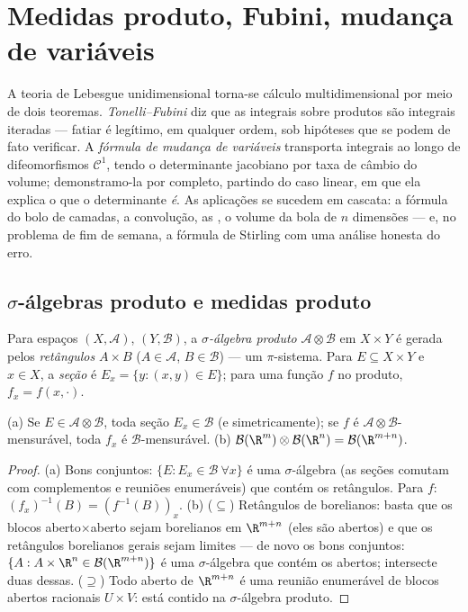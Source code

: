 \chapter{Medidas produto, Fubini, mudança de variáveis}
\label{ch:b3:product}

A teoria de Lebesgue unidimensional torna-se cálculo multidimensional
por meio de dois teoremas. \emph{Tonelli--Fubini} diz que as integrais
sobre produtos são integrais iteradas --- fatiar é legítimo, em
qualquer ordem, sob hipóteses que se podem de fato verificar. A
\emph{fórmula de mudança de variáveis} transporta integrais ao longo de
difeomorfismos $\mathcal C^1$, tendo o determinante jacobiano por taxa de câmbio
do volume; demonstramo-la por completo, partindo do caso linear, em que
ela explica o que o determinante \emph{é}. As aplicações se sucedem em
cascata: a fórmula do bolo de camadas, a convolução, as , o volume da bola de $n$ dimensões --- e, no problema de fim
de semana, a fórmula de Stirling com uma análise honesta do erro.

\section{$\sigma$-álgebras produto e medidas produto}

\begin{definition}\label{def:b3:product:sigma}
Para espaços  $(X, \mathcal A)$, $(Y, \mathcal B)$, a \emph{$\sigma$-álgebra
produto} $\mathcal A \otimes \mathcal B$ em $X \times
Y$ é gerada pelos
\emph{retângulos} $A \times B$ ($A \in
\mathcal A$, $B \in \mathcal B$) --- um $\pi$-sistema. Para $E
\subseteq X\times Y$ e
$x \in X$, a \emph{seção} é $E_x
= \{y : (x,y) \in E\}$; para uma função $f$ no produto, $f_x = f(x, \cdot)$.
\end{definition}

\begin{proposition}\label{prop:b3:product:sections}
(a) Se $E \in \mathcal A\otimes\mathcal B$, toda seção $E_x
\in \mathcal B$ (e simetricamente); se $f$ é
$\mathcal
A\otimes\mathcal B$-mensurável, toda $f_x$ é $\mathcal
B$-mensurável.
(b) $\mathcal B(\R^m)\otimes\mathcal B(\R^n) = \mathcal
B(\R^{m+n})$.
\end{proposition}

\begin{proof}
(a) Bons conjuntos: $\{E : E_x \in \mathcal B\ \forall x\}$ é uma $\sigma$-álgebra (as seções comutam
com complementos e reuniões enumeráveis) que contém os retângulos. Para
$f$: $(f_x)^{-1}(B) = (f^{-1}(B))_x$.
(b) ($\subseteq$) Retângulos de borelianos: basta que os blocos
aberto$\times$aberto sejam borelianos em $\R^{m+n}$ (eles são abertos) e
que os retângulos borelianos gerais sejam limites --- de novo os bons
conjuntos: $\{A : A\times\R^n \in \mathcal B(\R^{m+n})\}$ é uma $\sigma$-álgebra que contém os abertos;
intersecte duas dessas.
($\supseteq$) Todo aberto de $\R^{m+n}$ é uma reunião enumerável de blocos abertos
racionais $U\times V$: está contido na $\sigma$-álgebra produto.
\end{proof}

